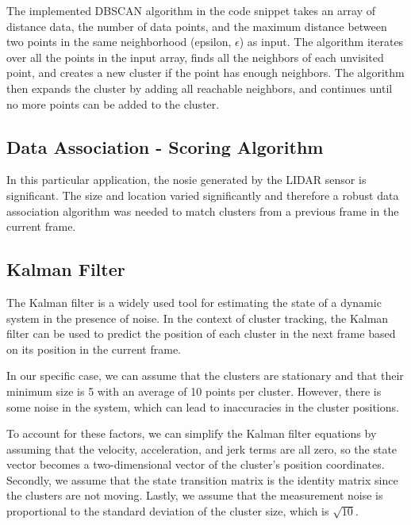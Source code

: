 \documentclass[journal]{IEEEtran} %
\begin{document}
The implemented DBSCAN algorithm in the code snippet takes an array of distance data, the number of data points, and the maximum distance between two points in the same neighborhood (epsilon, $\epsilon$) as input. The algorithm iterates over all the points in the input array, finds all the neighbors of each unvisited point, and creates a new cluster if the point has enough neighbors. The algorithm then expands the cluster by adding all reachable neighbors, and continues until no more points can be added to the cluster.

\subsection{Data Association - Scoring Algorithm}

In this particular application, the nosie generated by the LIDAR sensor is significant. The size and location varied significantly and therefore a robust data association algorithm was needed to match clusters from a previous frame in the current frame. 



\subsection{Kalman Filter}
The Kalman filter is a widely used tool for estimating the state of a dynamic system in the presence of noise. In the context of cluster tracking, the Kalman filter can be used to predict the position of each cluster in the next frame based on its position in the current frame.

In our specific case, we can assume that the clusters are stationary and that their minimum size is 5 with an average of 10 points per cluster. However, there is some noise in the system, which can lead to inaccuracies in the cluster positions.

To account for these factors, we can simplify the Kalman filter equations by assuming that the velocity, acceleration, and jerk terms are all zero, so the state vector becomes a two-dimensional vector of the cluster's position coordinates. Secondly, we assume that the state transition matrix is the identity matrix since the clusters are not moving. Lastly, we assume that the measurement noise is proportional to the standard deviation of the cluster size, which is $\sqrt{10}$.
\end{document}
